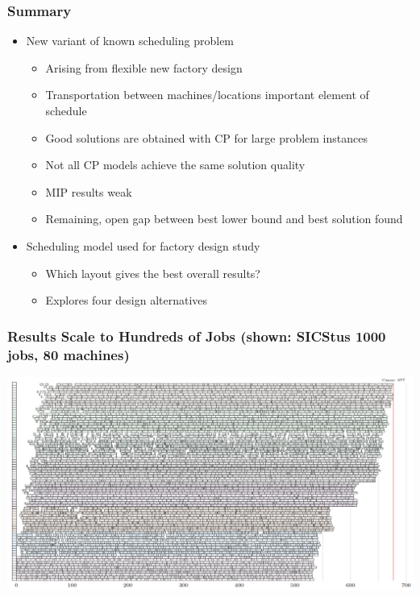 \begin{frame}
\frametitle{Summary}
\begin{itemize}
\item New variant of known scheduling problem
\begin{itemize}
\item Arising from flexible new factory design

\item Transportation between machines/locations important element of schedule

\item Good solutions are obtained with CP for large problem instances

\item Not all CP models achieve the same solution quality
\item MIP results weak
\item Remaining, open gap between best lower bound and best solution found
\end{itemize}

\item Scheduling model used for factory design study
\begin{itemize}
\item Which layout gives the best overall results?
\item Explores four design alternatives
\end{itemize}

\end{itemize}
\end{frame}


\begin{frame}
\frametitle{Results Scale to Hundreds of Jobs (shown: SICStus 1000 jobs, 80 machines)}
\includegraphics[width=14cm]{imagesjj/ganttchart}
\end{frame}







